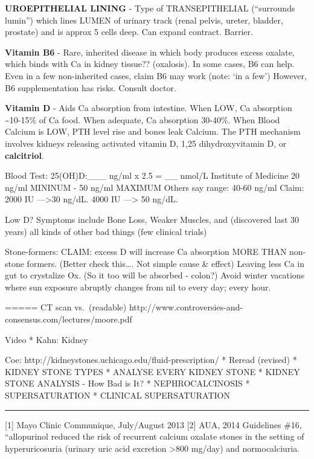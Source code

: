 \textbf{UROEPITHELIAL LINING} - Type of TRANSEPITHELIAL (``surrounds
lumin'') which lines LUMEN of urinary track (renal pelvis, ureter,
bladder, prostate) and is approx 5 cells deep. Can expand \textbar{}
contract. Barrier.

\textbf{Vitamin B6} - Rare, inherited disease in which body produces
excess oxalate, which binds with Ca in kidney tissue?? (oxalosis). In
some cases, B6 can help. Even in a few non-inherited cases, claim B6 may
work (note: `in a few') However, B6 supplementation has risks. Consult
doctor.

\textbf{Vitamin D} - Aids Ca absorption from intestine. When LOW, Ca
absorption \textasciitilde10-15\% of Ca food. When adequate, Ca
absorption 30-40\%. When Blood Calcium is LOW, PTH level rise and bones
leak Calcium. The PTH mechanism involves kidneys releasing activated
vitamin D, 1,25 dihydroxyvitamin D, or \textbf{calcitriol}.

Blood Test: 25(OH)D:\_\_\_ ng/ml x 2.5 = \_\_ nmol/L Institute of
Medicine 20 ng/ml MININUM - 50 ng/ml MAXIMUM Others say range: 40-60
ng/ml Claim: 2000 IU ---\textgreater30 ng/dL. 4000 IU ---\textgreater{}
50 ng/dL.

Low D? Symptoms include Bone Loss, Weaker Muscles, and (discovered last
30 years) all kinds of other bad things (few clinical trials)

Stone-formers: CLAIM: excess D will increase Ca absorption MORE THAN
non-stone formers. (Better check this\ldots. Not simple cause \& effect)
Leaving less Ca in gut to crystalize Ox. (So it too will be absorbed -
colon?) Avoid winter vacations where sun exposure abruptly changes from
nil to every day; every hour.

===== CT scan vs.~(readable)
http://www.controversies-and-consensus.com/lectures/moore.pdf

Video * Kahn: Kidney

Coe: http://kidneystones.uchicago.edu/fluid-prescription/ * Reread
(revised) * KIDNEY STONE TYPES * ANALYSE EVERY KIDNEY STONE * KIDNEY
STONE ANALYSIS - How Bad is It? * NEPHROCALCINOSIS * SUPERSATURATION *
CLINICAL SUPERSATURATION

\begin{center}\rule{0.5\linewidth}{0.5pt}\end{center}

{[}1{]} Mayo Clinic Communique, July/August 2013 {[}2{]} AUA, 2014
Guidelines \#16, ``allopurinol reduced the risk of recurrent calcium
oxalate stones in the setting of hyperuricosuria (urinary uric acid
excretion \textgreater800 mg/day) and normocalciuria.

